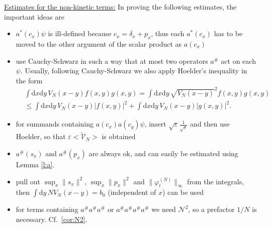 \documentclass[11pt,a4paper,draft,DIV11]{scrartcl}	%
\newcommand{\di}{\textrm{d}}		%
\newcommand{\Ncal}{\mathcal{N}}		%
\newcommand{\tilV}{\tilde{\mathcal{V}}_N}		%
\newcommand{\norm}[1]{\lVert#1\rVert}	%
\newcommand{\ev}[1]{\big<#1\big>}	%
\newcommand{\ph}{\varphi_t^{(N)}}	%
\newcommand{\bd}{\begin{displaymath}}			%
\newcommand{\ed}{\end{displaymath}}
\begin{document}
\underline{Estimates for the non-kinetic terms:}\newline
In proving the following estimates, the important ideas are
\begin{itemize}
 \item $a^*(c_x)\psi$ is ill-defined because $c_x = \delta_x + p_x$, thus each $a^\ast(c_x)$ has to be moved to the other argument of the scalar product as $a(c_x)$
\item use Cauchy-Schwarz in such a way that at most two operators $a^\#$ act on each $\psi$. Usually, following Cauchy-Schwarz we also apply Hoelder's inequality in the form
\bd
\begin{split}
& \int \di x \di y\, V_N(x-y) f(x,y) g(x,y) = \int \di x \di y\, \sqrt{V_N(x-y)}^2 f(x,y) g(x,y)\\
&  \leq \int \di x\di y\, V_N(x-y) \lvert f(x,y)\rvert^2 + \int \di x\di y\, V_N(x-y) \lvert g(x,y)\rvert^2.
\end{split}
\ed
 \item for summands containing $a(c_x) a(c_y) \psi$, insert $\sqrt{\varepsilon} \frac{1}{\sqrt{\varepsilon}}$ and then use Hoelder, so that $\varepsilon\ev{\tilV}$ is obtained
 \item $a^\#(s_x)$ and $a^\#(p_x)$ are always ok, and can easily be estimated using Lemma \ref{l:a}.
 \item pull out $\sup_x \norm{s_x}^2$, $\sup_x \norm{p_x}^2$ and $\norm{\ph}_\infty$ from the integrals, then $\int \di y\, NV_N(x-y) = b_0$ (independent of $x$) can be used
\item for terms containing $a^\# a^\# a^\#$ or $a^\# a^\# a^\# a^\#$ we need $\Ncal^2$, so a prefactor $1/N$ is necessary. Cf.\ \ref{cor:N2}. 
\end{itemize}
\end{document}
